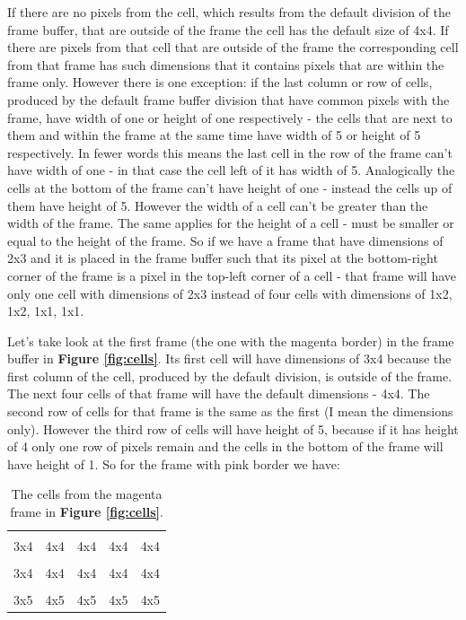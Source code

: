 If there are no pixels from the cell, which results from the default division of 
the frame buffer, that are outside of the frame the cell has the default size of 
4x4. If there are pixels from that cell that are outside of the frame the 
corresponding cell from that frame has such dimensions that it contains pixels 
that are within the frame only. However there is one exception: if the last 
column or row of cells, produced by the default frame buffer division that have 
common pixels with the frame, have width of one or height of one respectively - 
the cells that are next to them and within the frame at the same time have width 
of 5 or height of 5 respectively. In fewer words this means the last cell in the 
row of the frame can't have width of one - in that case the cell left of it has 
width of 5. Analogically the cells at the bottom of the frame can't have height 
of one - instead the cells up of them have height of 5. However the width of a 
cell can't be greater than the width of the frame. The same applies for the 
height of a cell - must be smaller or equal to the height of the frame. So if we 
have a frame that have dimensions of 2x3 and it is placed in the frame buffer 
such that its pixel at the bottom-right corner of the frame is a pixel in the 
top-left corner of a cell - that frame will have only one cell with dimensions 
of 2x3 instead of four cells with dimensions of 1x2, 1x2, 1x1, 1x1.

Let's take look at the first frame (the one with the magenta border) 
in the frame buffer in \textbf{Figure \ref{fig:cells}}. 
Its first cell will have dimensions of 3x4 because the first column of the cell, 
produced by the default division, is outside of the frame. The next four cells 
of that frame will have the default dimensions - 4x4. The second row of cells 
for that frame is the same as the first (I mean the dimensions only). However 
the third row of cells will have height of 5, because if it has height of 4 only 
one row of pixels remain and the cells in the bottom of the frame will have 
height of 1. So for the frame with pink border we have:

\begin{table}[!h]
	\centering
	\begin{tabular}{|p{0.6cm}|p{1cm}|p{1cm}|p{1cm}|p{1cm}|}
		\hline
		& & & & \\[0.5cm] %
		3x4 & 4x4 & 4x4 & 4x4 & 4x4 \\
		\hline
		& & & & \\[0.5cm]
		3x4 & 4x4 & 4x4 & 4x4 & 4x4 \\
		\hline
		& & & & \\[1cm]
		3x5 & 4x5 & 4x5 & 4x5 & 4x5 \\
		\hline
	\end{tabular}
	\label{fig:cellstable1}
	\caption{ 
		The cells from the magenta frame in \textbf{Figure \ref{fig:cells}}.  
	}
\end{table}


